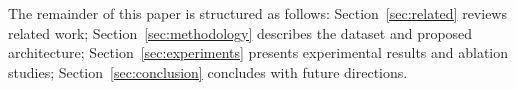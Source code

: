 \noindent The remainder of this paper is structured as follows:
Section~\ref{sec:related} reviews related work;
Section~\ref{sec:methodology} describes the dataset and proposed architecture;
Section~\ref{sec:experiments} presents experimental results and ablation
studies; Section~\ref{sec:conclusion} concludes with future directions.
